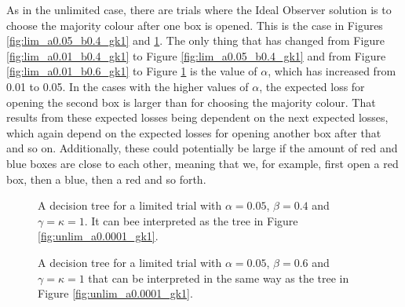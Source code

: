 As in the unlimited case, there are trials where the Ideal Observer solution is to choose the majority colour after one box is opened. This is the case in Figures \ref{fig:lim_a0.05_b0.4_gk1} and \ref{fig:lim_a0.05_b0.6_gk1}. The only thing that has changed from Figure \ref{fig:lim_a0.01_b0.4_gk1} to Figure \ref{fig:lim_a0.05_b0.4_gk1} and from Figure \ref{fig:lim_a0.01_b0.6_gk1} to Figure \ref{fig:lim_a0.05_b0.6_gk1} is the value of $\alpha$, which has increased from 0.01 to 0.05. In the cases with the higher values of $\alpha$, the expected loss for opening the second box is larger than for choosing the majority colour. That results from these expected losses being dependent on the next expected losses, which again depend on the expected losses for opening another box after that and so on. Additionally, these could potentially be large if the amount of red and blue boxes are close to each other, meaning that we, for example, first open a red box, then a blue, then a red and so forth. 

\begin{figure}
    \centering
    \begin{minipage}[t]{0.45\textwidth} 
        \centering
        \scalebox{0.8}{}
        \caption[IO solution limited. $\alpha=0.05$, $\beta=0.4$ and $\gamma=\kappa=1$.]{A decision tree for a limited trial with $\alpha = 0.05$, $\beta=0.4$ and $\gamma=\kappa=1$. It can bee interpreted as the tree in Figure \ref{fig:unlim_a0.0001_gk1}.}
        \label{fig:lim_a0.05_b0.4_gk1}
    \end{minipage}\hfill
    \begin{minipage}[t]{0.45\textwidth} 
        \centering
        \scalebox{0.8}{}
        \caption[IO solution limited. $\alpha=0.05$, $\beta=0.6$ and $\gamma=\kappa=1$.]{A decision tree for a limited trial with $\alpha = 0.05$, $\beta=0.6$ and $\gamma=\kappa=1$ that can be interpreted in the same way as the tree in Figure \ref{fig:unlim_a0.0001_gk1}.}
        \label{fig:lim_a0.05_b0.6_gk1}
    \end{minipage}
\end{figure}

